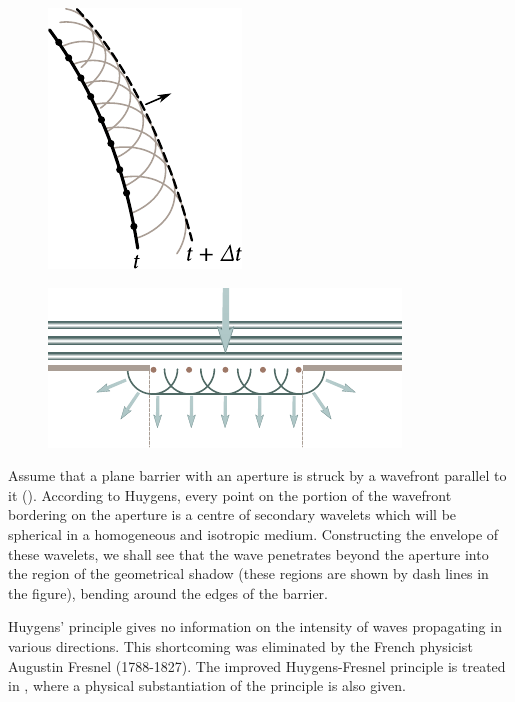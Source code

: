 \begin{figure}[t]
	\begin{minipage}[t]{0.41\linewidth}
		\begin{center}
			\includegraphics[scale=1]{figures/ch_16/fig_16_21.pdf}
			\caption[]{}
			\label{fig:16_21}
		\end{center}
	\end{minipage}
	\hfill{ }%
	\begin{minipage}[t]{0.55\linewidth}
		\begin{center}
			\includegraphics[scale=1]{figures/ch_16/fig_16_22.pdf}
            \caption[]{}
			\label{fig:16_22}
		\end{center}
	\end{minipage}
\vspace{-0.4cm}
\end{figure}

Assume that a plane barrier with an aperture is struck by a wavefront parallel to it ().
According to Huygens, every point on the portion of the wavefront bordering on the aperture is a centre of secondary wavelets which will be spherical in a homogeneous and isotropic medium.
Constructing the envelope of these wavelets, we shall see that the wave penetrates beyond the aperture into the region of the geometrical shadow (these regions are shown by dash lines in the figure), bending around the edges of the barrier.

Huygens' principle gives no information on the intensity of waves propagating in various directions.
This shortcoming was eliminated by the French physicist Augustin Fresnel (1788-1827).
The improved Huygens-Fresnel principle is treated in , where a physical substantiation of the principle is also given.
